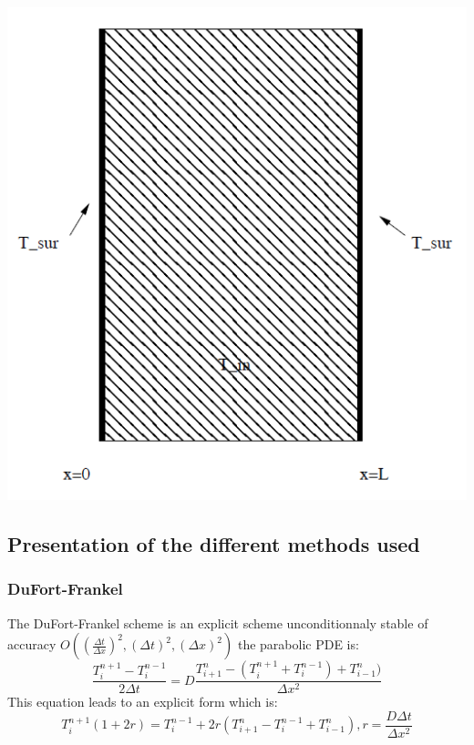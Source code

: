 \documentclass [10 pt, a4 paper]{article}
\begin{document}
\begin{center}
    \includegraphics[scale=0.6]{Chart/problem.PNG}
\end{center}

\subsection{Presentation of the different methods used}

\subsubsection{DuFort-Frankel}
The DuFort-Frankel scheme is an explicit scheme unconditionnaly stable of accuracy 
$O((\frac{\Delta t}{\Delta x})^{2}, (\Delta t)^{2},( \Delta x)^{2})$ the parabolic PDE is:
\begin{equation}
    \frac{T_{i}^{n+1} - T_{i}^{n-1}}{2\Delta t} = D \frac{T_{i+1}^{n} -(T_{i}^{n+1} + T_{i}^{n-1}) + T_{i-1}^{n})}{\Delta x^{2}}
\end{equation}
This equation leads to an explicit form which is:
\begin{equation}
    T_{i}^{n+1}(1 + 2r) = T_{i}^{n-1} +2r(T_{i+1}^{n} - T_{i}^{n-1} + T_{i-1}^{n}), r =\frac{D\Delta t}{\Delta x^{2}}
\end{equation}
\end{document}
